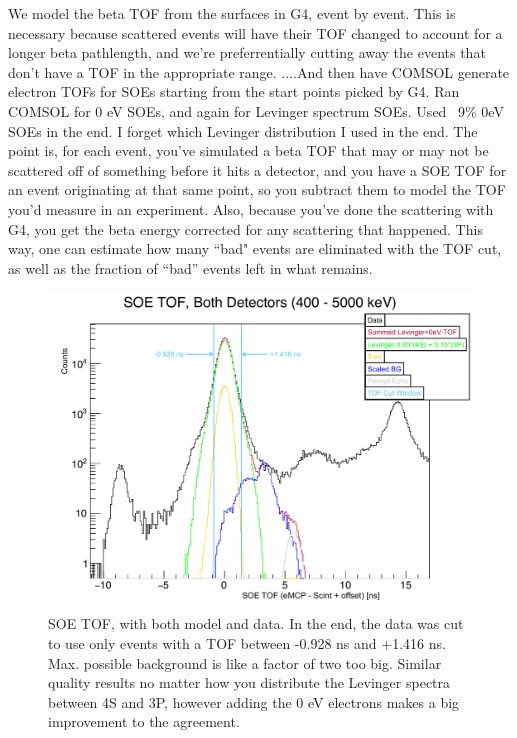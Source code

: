 We model the beta TOF from the surfaces in G4, event by event.  This is necessary because scattered  events will have their TOF changed to account for a longer beta pathlength, and we're preferrentially cutting away the events that don't have a TOF in the appropriate range.  ....And then have COMSOL generate electron TOFs for SOEs starting from the start points picked by G4.  Ran COMSOL for 0 eV SOEs, and again for Levinger spectrum SOEs.  Used ~9\% 0eV SOEs in the end.  I forget which Levinger distribution I used in the end.    The point is, for each event, you've simulated a beta TOF that may or may not be scattered off of something before it hits a detector, and you have a SOE TOF for an event originating at that same point, so you subtract them to model the TOF you'd measure in an experiment.  Also, because you've done the scattering with G4, you get the beta energy corrected for any scattering that happened.  This way, one can estimate %
how many ``bad" events are eliminated with the TOF cut, as well as the fraction of ``bad'' events left in what remains.


\begin{figure}[h!tb]
	\centering
	\includegraphics[width=.999\linewidth]
	{Figures/SOE_TOF_Spectra.pdf}
	\caption[SOE TOF -- Model and Data]{SOE TOF, with both model and data.  In the end, the data was cut to use only events with a TOF between -0.928 ns and +1.416 ns.  Max. possible background is like a factor of two too big.  Similar quality results no matter how you distribute the Levinger spectra between 4S and 3P, however adding the 0 eV electrons makes a big improvement to the agreement. }	
	\label{fig:soetof}
\end{figure}

